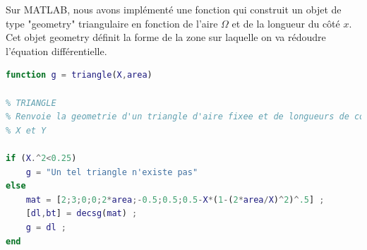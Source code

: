 \documentclass[a4paper,reqno]{article}
\begin{document}
Sur MATLAB, nous avons implémenté une fonction qui construit un objet de type "geometry" triangulaire en fonction de l'aire $\Omega$ et de la longueur du côté $x$. Cet objet geometry définit la forme de la zone sur laquelle on va rédoudre l'équation différentielle. 

\newpage

\begin{lstlisting}[language=Matlab,frame=single,caption=Construction d'une géométrie Triangulaire]
function g = triangle(X,area)

% TRIANGLE
% Renvoie la geometrie d'un triangle d'aire fixee et de longueurs de cote 
% X et Y 

if (X.^2<0.25)
    g = "Un tel triangle n'existe pas" 
else 
    mat = [2;3;0;0;2*area;-0.5;0.5;0.5-X*(1-(2*area/X)^2)^.5] ; 
    [dl,bt] = decsg(mat) ;
    g = dl ;
end
\end{lstlisting}

\end{document}
